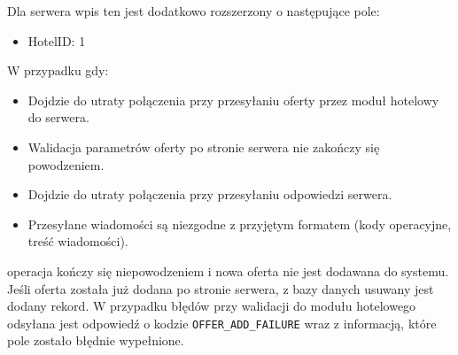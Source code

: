\documentclass{article}
\begin{document}
Dla serwera wpis ten jest dodatkowo rozszerzony o następujące pole:
\begin{itemize}
    \item HotelID: 1
\end{itemize}
W przypadku gdy:
\begin{itemize}
    \item Dojdzie do utraty połączenia przy przesyłaniu oferty przez moduł hotelowy do serwera. 
    \item Walidacja parametrów oferty po stronie serwera nie zakończy się powodzeniem.
    \item Dojdzie do utraty połączenia przy przesyłaniu odpowiedzi serwera.
    \item Przesyłane wiadomości są niezgodne z przyjętym formatem (kody operacyjne, treść wiadomości).
\end{itemize}
operacja kończy się niepowodzeniem i nowa oferta nie jest dodawana do systemu. Jeśli oferta została już dodana po stronie serwera, z bazy danych usuwany jest dodany rekord. W przypadku błędów przy walidacji do modułu hotelowego odsyłana jest odpowiedź o kodzie \texttt{OFFER\_ADD\_FAILURE} wraz z informacją, które pole zostało błędnie wypełnione.
\end{document}
